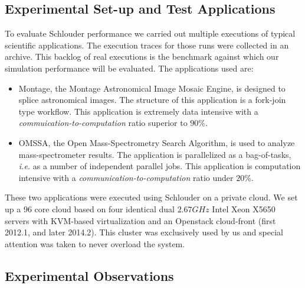 \documentclass[10pt,conference,compsocconf]{IEEEtran}
\begin{document}
\subsection{Experimental Set-up and Test Applications}\label{sc:setup}

To evaluate Schlouder performance we carried out multiple executions of
typical scientific applications. The execution traces for those runs were
collected in an archive. This backlog of real executions is the benchmark
against which our simulation performance will be evaluated. The applications
used are:

\begin{itemize}
	\item Montage\cite{montage2009}, the Montage Astronomical Image Mosaic
		Engine, is designed to splice astronomical images. The structure
                of this application is a fork-join type workflow. This
                application  is extremely data intensive with a
		\emph{commuication-to-computation} ratio superior to $90\%$.
	\item OMSSA\cite{Geer2004}, the Open Mass-Spectrometry Search Algorithm, 
		is used to analyze mass-spectrometer results. The application is
                parallelized as a bag-of-tasks, \textit{i.e.} as a number of
                independent parallel jobs. This application is
		computation intensive with a
		\emph{communication-to-computation} ratio under $20\%$.
\end{itemize}

These two applications were executed using Schlouder on a private cloud.  We set
up a 96 core cloud based on four identical  dual $2.67GHz$ Intel Xeon X5650
servers with KVM-based virtualization  and an Openstack cloud-front (first
2012.1, and later 2014.2). This cluster was exclusively used by us and special
attention was taken to never overload the system.

\subsection{Experimental Observations}
\end{document}
